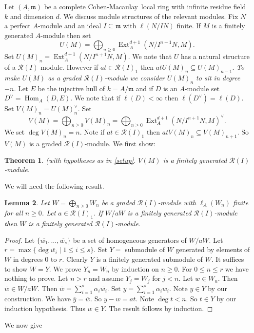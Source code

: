 \documentclass{amsart}
\newcommand{\CM}{Cohen-Macaulay}
\newcommand{\m}{\mathfrak{m} }
\newcommand{\R}{\mathcal{R} }
\newcommand{\ov}{\overline}
\newcommand{\Hom}{\operatorname{Hom}}
\newcommand{\Ext}{\operatorname{Ext}}
\theoremstyle{plain}
\newtheorem{theorem}{Theorem}[section]
\newtheorem{lemma}[theorem]{Lemma}
\theoremstyle{definition}
\theoremstyle{remark}
\begin{document}
\s\label{setup} Let $(A,\m)$ be a complete \CM \ local ring with infinite residue field $k$ and dimension $d$. We discuss module structures of the relevant modules. Fix $N$ a perfect $A$-module and an ideal $I \subseteq \m$ with
$\ell(N/IN)$ finite.
  If $M$ is a finitely generated $A$-module then set $$U(M) = \bigoplus_{n \geq 0}\Ext^{d+1}_A( N/I^{n+1}N, M).$$ Set $U(M)_n = \Ext^{d+1}_A(N/I^{n+1}N, M)$. We note that $U$ has a natural structure of a $\R(I)$-module. However if $at \in \R(I)_1$ then $atU(M)_n \subseteq U(M)_{n-1}$. \emph{To make  $U(M)$ as a graded $\R(I)$-module we consider $U(M)_n$ to sit in degree $-n$.} Let $E$ be the injective hull of $k = A/\m$ and if $D$ is an $A$-module set $D^\vee = \Hom_A(D, E)$. We note that if $\ell(D) <  \infty $ then $\ell(D^\vee) = \ell(D)$. Set $V(M)_n = U(M)_n^\vee$. Set
$$V(M) = \bigoplus_{n \geq 0} V(M)_n = \bigoplus_{n \geq 0}\Ext^{d+1}_A( N/I^{n+1}N, M)^\vee.$$
We set $\deg V(M)_n = n$. Note if $at \in \R(I)_1$ then $atV(M)_n \subseteq V(M)_{n+1}$.
So $V(M)$ is a graded $\R(I)$-module.
We first show:
\begin{theorem}\label{dual}(with hypotheses as in \ref{setup}. $V(M)$ is a finitely generated $\R(I)$-module.
\end{theorem}
We will need the following result.
\begin{lemma}
\label{Noeth} Let $W = \bigoplus_{n \geq 0}W_n$ be a graded $\R(I)$-module with $\ell_A(W_n)$ finite for all $n \geq 0$. Let $a \in \R(I)_1$. If $W/aW$ is a finitely generated $\R(I)$-module then
$W$ is a finitely generated $\R(I)$-module.
\end{lemma}
\begin{proof}
Let $\{ \ov{w_1}, \ldots, \ov{w_s}\}$ be a set of homogeneous generators of $W/aW$. Let $r = \max \{ \deg \ov{w_i} \mid 1 \leq i \leq s \}$. Set $Y = $ submodule of $W$ generated by elements of $W$ in degrees $0$ to $r$. Clearly $Y$ is a finitely generated submodule of $W$. It suffices to show $W = Y$. We prove $Y_n = W_n$ by induction on $n \geq 0$. For $0 \leq n \leq r$ we have nothing to prove. Let $n > r$ and assume $Y_j = W_j$ for $j < n$. Let $w \in W_n$. Then $\ov{w} \in W/aW$. Then $\ov{w} = \sum_{i = 1}^{s}\alpha_i\ov{w_i}$.
 Set $y  = \sum_{i = 1}^{s}\alpha_iw_i$. Note $y \in Y$ by our construction. We have $\ov{y} = \ov{w}$. So $y - w = a t$. Note $\deg t < n$. So $t \in Y$ by our induction hypothesis. Thus $w \in Y$. The result follows by induction.
\end{proof}
We now give
\end{document}
